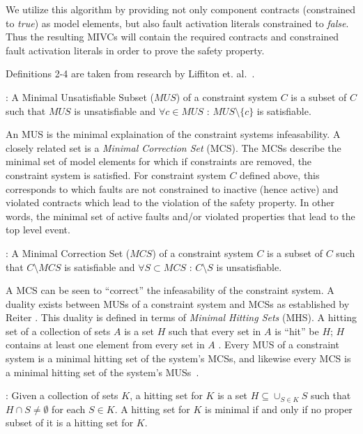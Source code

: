 We utilize this algorithm by providing not only component contracts (constrained to \textit{true}) as model elements, but also fault activation literals constrained to \textit{false}. Thus the resulting MIVCs will contain the required contracts and constrained fault activation literals in order to prove the safety property. %

Definitions 2-4 are taken from research by Liffiton et. al.~\cite{liffiton2016fast}. 

\begin{definition} : A Minimal Unsatisfiable Subset ($MUS$) of a constraint system $C$ is a subset of $C$ such that $MUS$ is unsatisfiable and $\forall c \in MUS$ : $MUS \setminus \{c\}$ is satisfiable. 
\end{definition}
An MUS is the minimal explaination of the constraint systems infeasability. A closely related set is a \textit{Minimal Correction Set} (MCS). The MCSs describe the minimal set of model elements for which if constraints are removed, the constraint system is satisfied. For constraint system $C$ defined above, this corresponds to which faults are not constrained to inactive (hence active) and violated contracts which lead to the violation of the safety property. In other words, the minimal set of active faults and/or violated properties that lead to the top level event.  

\begin{definition} : A Minimal Correction Set ($MCS$) of a constraint system $C$ is a subset of $C$ such that $C \setminus MCS$ is satisfiable and $\forall S \subset MCS$ : $C \setminus S$ is unsatisfiable. 
\end{definition}
A MCS can be seen to ``correct'' the infeasability of the constraint system. A duality exists between MUSs of a constraint system and MCSs as established by Reiter \cite{reiter1987theory}. This duality is defined in terms of \textit{Minimal Hitting Sets} (MHS). A hitting set of a collection of sets $A$ is a set $H$ such that every set in $A$ is ``hit'' be $H$; $H$ contains at least one element from every set in $A$ \cite{liffiton2016fast}. Every MUS of a constraint system is a minimal hitting set of the system's MCSs, and likewise every MCS is a minimal hitting set of the system's MUSs~\cite{liffiton2016fast, reiter1987theory, de1987diagnosing}.

\begin{definition}: Given a collection of sets $K$, a hitting set for $K$ is a set $H \subseteq \cup_{S \in K} S$ such that $H \cap S \neq \emptyset$ for each $S  \in K$. A hitting set for $K$ is minimal if and only if no proper subset of it is a hitting set for $K$. 
\end{definition}

